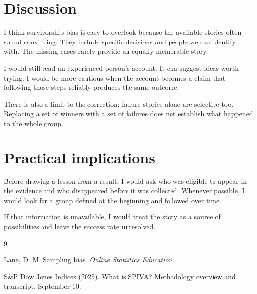 \documentclass[11pt,a4paper]{article}
\begin{document}
\section{Discussion}

I think survivorship bias is easy to overlook because the available
stories often sound convincing. They include specific decisions and
people we can identify with. The missing cases rarely provide an equally
memorable story.

I would still read an experienced person's account. It can suggest ideas
worth trying. I would be more cautious when the account becomes a claim
that following those steps reliably produces the same outcome.

There is also a limit to the correction: failure stories alone are
selective too. Replacing a set of winners with a set of failures does
not establish what happened to the whole group.

\section{Practical implications}

Before drawing a lesson from a result, I would ask who was eligible to
appear in the evidence and who disappeared before it was collected.
Whenever possible, I would look for a group defined at the beginning
and followed over time.

If that information is unavailable, I would treat the story as a source
of possibilities and leave the success rate unresolved.

\renewcommand{\refname}{References}
\begin{thebibliography}{9}
\small
\setlength{\itemsep}{0.35em}

Lane, D. M.
\href{https://onlinestatbook.com/2/research_design/sampling.html}
{Sampling bias.}
\textit{Online Statistics Education}.

S\&P Dow Jones Indices (2025).
\href{https://www.spglobal.com/spdji/en/index-tv/article/what-is-spiva/}
{What is SPIVA?}
Methodology overview and transcript, September 10.

\end{thebibliography}
\end{document}
